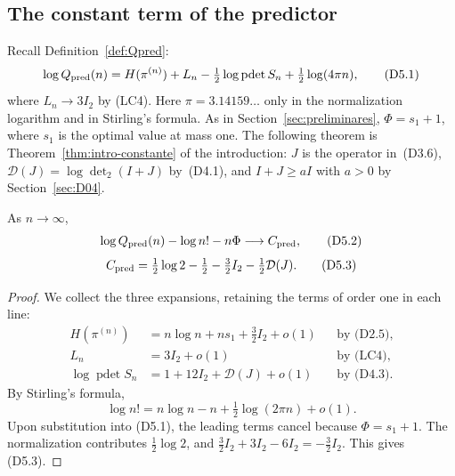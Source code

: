 \subsection{The constant term of the predictor}\label{sec:D05}
Recall Definition~\ref{def:Qpred}:
\[
 \log Q_{\rm pred}(n)=H(\pi^{(n)})+L_n
           -\tfrac12\log\operatorname{pdet}S_n
           +\tfrac12\log(4\pi n),                    \tag{D5.1}
\]
where $L_n\to3I_2$ by (LC4).
Here $\pi=3.14159\ldots$ only in the normalization logarithm and in Stirling's formula.
As in Section~\ref{sec:preliminares}, $\Phi=s_1+1$, where $s_1$ is the optimal value
at mass one.
The following theorem is Theorem~\ref{thm:intro-constante} of the introduction: $J$ is the operator
in~(D3.6), $\mathcal D(J)=\log\det_2(I+J)$ by~(D4.1), and $I+J\ge aI$ with $a>0$ by
Section~\ref{sec:D04}.

\begin{teorema}\label{thm:constante}
As $n\to\infty$,
\[
 \log Q_{\rm pred}(n)-\log n!-n\Phi\longrightarrow C_{\rm pred},
                                                        \tag{D5.2}
\]
\[
 C_{\rm pred}=\tfrac12\log2-\tfrac12
             -\tfrac32 I_2-\tfrac12\mathcal D(J).     \tag{D5.3}
\]
\end{teorema}
\begin{proof}
We collect the three expansions, retaining the terms of order one in each line:
\[
\begin{aligned}
 H(\pi^{(n)}) &= n\log n+ns_1+\tfrac32 I_2+o(1) &&\text{by (D2.5)},\\
 L_n &= 3I_2+o(1) &&\text{by (LC4)},\\
 \log\operatorname{pdet}S_n &=1+12I_2+\mathcal D(J)+o(1) &&\text{by (D4.3)}.
\end{aligned}
\]
By Stirling's formula,
\[
 \log n!=n\log n-n+\tfrac12\log(2\pi n)+o(1).
\]
Upon substitution into (D5.1), the leading terms cancel because
$\Phi=s_1+1$. The normalization contributes $\tfrac12\log2$,
and $\tfrac32I_2+3I_2-6I_2=-\tfrac32I_2$.
This gives (D5.3).
\end{proof}
